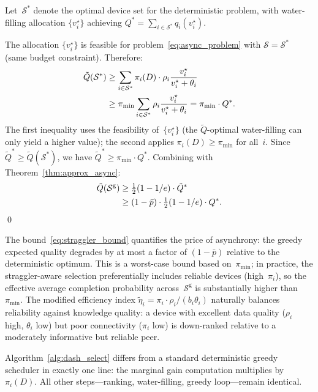 \documentclass[a4paper,fleqn]{cas-dc}
\newcommand{\Sset}{\mathcal{S}}
\begin{document}
	\begin{pf}
		Let~$\Sset^*$ denote the optimal device set for the deterministic
		problem, with water-filling allocation $\{v_i^{\star}\}$ achieving
		$Q^* = \sum_{i \in \Sset^*} q_i(v_i^{\star})$.
		
		The allocation $\{v_i^{\star}\}$ is feasible for
		problem~\eqref{eq:async_problem} with $\Sset = \Sset^*$ (same budget
		constraint).  Therefore:
		\begin{align}
			\tilde{Q}(\Sset^*)
			&\geq \sum_{i \in \Sset^*}
			\pi_i(D) \cdot \rho_i
			\frac{v_i^{\star}}{v_i^{\star} + \theta_i}
			\notag \\
			&\geq \pi_{\min}
			\sum_{i \in \Sset^*}
			\rho_i \frac{v_i^{\star}}{v_i^{\star} + \theta_i}
			= \pi_{\min} \cdot Q^*.
			\label{eq:step1}
		\end{align}
		The first inequality uses the feasibility of~$\{v_i^{\star}\}$ (the
		$\tilde{Q}$-optimal water-filling can only yield a higher value); the
		second applies $\pi_i(D) \geq \pi_{\min}$ for all~$i$.
		Since $\tilde{Q}^* \geq \tilde{Q}(\Sset^*)$, we have
		$\tilde{Q}^* \geq \pi_{\min} \cdot Q^*$.
		Combining with Theorem~\ref{thm:approx_async}:
		\begin{align}
			\tilde{Q}(\Sset^{\mathrm{g}})
			&\geq \tfrac{1}{2}(1 - 1/e) \cdot \tilde{Q}^*
			\notag \\
			&\geq (1 - \bar{p}) \cdot
			\tfrac{1}{2}(1 - 1/e) \cdot Q^*.
			\label{eq:step2}
		\end{align}
		\qed\end{pf}
	
	The bound~\eqref{eq:straggler_bound} quantifies the price of
	asynchrony: the greedy expected quality degrades by at most a factor
	of $(1 - \bar{p})$ relative to the deterministic optimum.  This is a
	worst-case bound based on~$\pi_{\min}$; in practice, the
	straggler-aware selection preferentially includes reliable devices
	(high~$\pi_i$), so the effective average completion probability
	across~$\Sset^{\mathrm{g}}$ is substantially higher
	than~$\pi_{\min}$.  The modified efficiency index
	$\tilde{\eta}_i = \pi_i \cdot \rho_i / (b_i \theta_i)$ naturally
	balances reliability against knowledge quality: a device with
	excellent data quality ($\rho_i$ high, $\theta_i$ low) but poor
	connectivity ($\pi_i$ low) is down-ranked relative to a moderately
	informative but reliable peer.
	
	Algorithm~\ref{alg:dash_select} differs from a standard
	deterministic greedy scheduler in exactly one line: the marginal gain
	computation multiplies by~$\pi_i(D)$.  All other steps---ranking,
	water-filling, greedy loop---remain identical.
	
\end{document}
